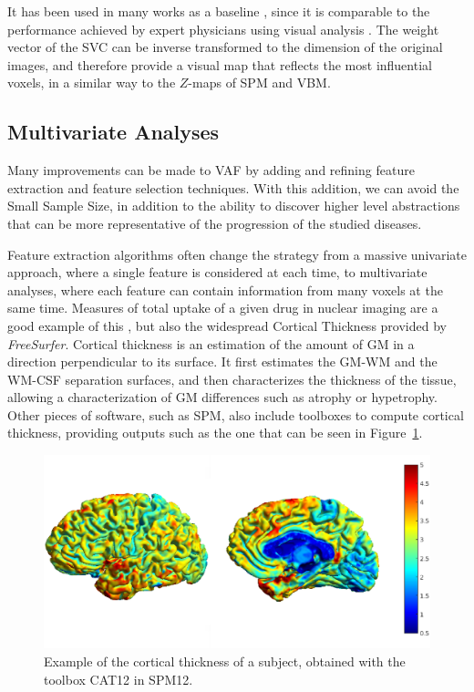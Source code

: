 It has been used in many works as a baseline \cite{Spetsieris2009,Salas-Gonzalez2009,Martinez-Murcia2016}, since it is comparable to the performance achieved by expert physicians using visual analysis \cite{Stoeckel04}. The weight vector of the \ac{SVC} can be inverse transformed to the dimension of the original images, and therefore provide a visual map that reflects the most influential voxels, in a similar way to the $Z$-maps of \ac{SPM} and \ac{VBM}. 

\subsection{Multivariate Analyses}\label{sec:mvanalyses}
Many improvements can be made to \ac{VAF} by adding and refining feature extraction and feature selection techniques. With this addition, we can avoid the Small Sample Size, in addition to the ability to discover higher level abstractions that can be more representative of the progression of the studied diseases. 

Feature extraction algorithms often change the strategy from a massive univariate approach, where a single feature is considered at each time, to multivariate analyses, where each feature can contain information from many voxels at the same time. Measures of total uptake of a given drug in nuclear imaging are a good example of this \cite{Zhou2007,Lozano2007}, but also the widespread Cortical Thickness \cite{Dale1999} provided by \textit{FreeSurfer}. Cortical thickness is an estimation of the amount of \ac{GM} in a direction perpendicular to its surface. It first estimates the \ac{GM}-\ac{WM} and the \ac{WM}-\ac{CSF} separation surfaces, and then characterizes the thickness of the tissue, allowing a characterization of \ac{GM} differences such as atrophy or hypetrophy. Other pieces of software, such as \ac{SPM}, also include toolboxes to compute cortical thickness, providing outputs such as the one that can be seen in Figure~\ref{fig:corticalthickness}. 

\begin{figure}
\centering
\includegraphics[width=0.8\linewidth]{Graphics/ch2/corticalThickness}
\caption[Example of the cortical thickness of a subject.]{Example of the cortical thickness of a subject, obtained with the toolbox CAT12 in SPM12.}
\label{fig:corticalthickness}
\end{figure}

